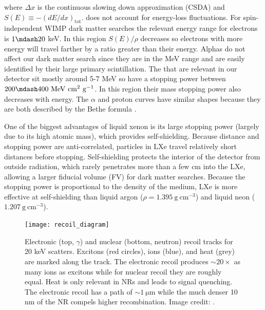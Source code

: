 \noindent where $\Delta x$ is the continuous slowing down approximation (CSDA) and
$S(E) \equiv -(dE/dx)_{\mathrm{tot}}$.   does not account for energy-loss
fluctuations.  For spin-independent
WIMP dark matter searches the relevant energy range for electrons is $1 \mdash 20$ keV.  In this region $S(E)/\rho$ decreases so
electrons with more energy will travel farther by a ratio greater than their energy.  Alphas do not affect
our dark matter search since they are in the MeV range and are easily identified by their large primary scintillation.  The
\alphadecays that are relevant in our detector sit mostly around 5-7 MeV so have a stopping power between
$200 \mdash 400\ \mathrm{MeV\ cm^2\ g^{-1}}$.  In this region their mass stopping power also decreases with energy.  The $\alpha$ and
proton curves have similar shapes because they are both described by the Bethe formula .

One of the biggest advantages of liquid xenon is its large stopping power (largely due to its high atomic
mass), which provides self-shielding.  Because distance and stopping power are anti-correlated, particles in LXe travel relatively short
distances before stopping.  Self-shielding protects the interior of the detector from outside radiation,
which rarely penetrates more than a few cm
into the LXe, allowing a larger fiducial volume (FV) for dark matter searches.  Because the stopping power is proportional to the
density of the medium, LXe is more effective at self-shielding than liquid argon ($\rho = 1.395\ \mathrm{g\ cm^{-3}}$) and liquid neon
($1.207\ \mathrm{g\ cm^{-3}}$).

\begin{figure}
\centering
\texttt{[image: recoil\_diagram]}
\caption[Electronic (top, $\gamma$) and nuclear (bottom, neutron) recoil tracks for 20 keV scatters.]{Electronic (top, $\gamma$) and nuclear
(bottom, neutron) recoil tracks for 20 keV scatters.  Excitons (red circles), ions (blue), and
heat (grey) are marked along the track.  The electronic recoil produces ${\sim} 20 \times$ as many ions as excitons while for nuclear
recoil they are roughly equal.  Heat is only relevant in NRs and leads to signal quenching.  The electronic recoil has a path of
${\sim} 1\ \mathrm{\mu m}$ while the much denser 10 nm of the NR compels higher recombination.  Image credit: .}
\label{fig:er_nr_recoil_diagram}
\end{figure}

